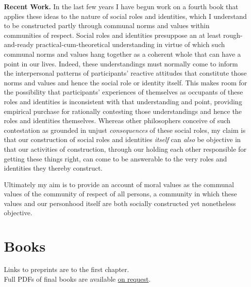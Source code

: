 \documentclass[%
  11pt,%
]{article}
\makeatletter
\newcommand{\onrequest}{\href{mailto:bhelm@fandm.edu}{on request}}
\makeatother
\begin{document}
\noindent\textbf{Recent Work.}
In the last few years I have begun work on a fourth book that applies these ideas to the nature of social roles and identities, which I understand to be constructed partly through communal norms and values within communities of respect. Social roles and identities presuppose an at least rough-and-ready practical-cum-theoretical understanding in virtue of which such communal norms and values hang together as a coherent whole that can have a point in our lives. Indeed, these understandings must normally come to inform the interpersonal patterns of participants' reactive attitudes that constitute those norms and values and hence the social role or identity itself. This makes room for the possibility that participants' experiences of themselves as occupants of these roles and identities is inconsistent with that understanding and point, providing empirical purchase for rationally contesting those understandings and hence the roles and identities themselves. Whereas other philosophers conceive of such contestation as grounded in unjust \emph{consequences} of these social roles, my claim is that our construction of social roles and identities \emph{itself} can \emph{also} be objective in that our activities of construction, through our holding each other responsible for getting these things right, can come to be answerable to the very roles and identities they thereby construct.

\bigskip{}

Ultimately my aim is to provide an account of moral values as the communal values of the community of respect of all persons, a community in which these values and our personhood itself are both socially constructed yet nonetheless objective.


\section{Books}

\newrefsection

\begin{center}
  Links to preprints are to the first chapter.\\
  Full PDFs of final books are available \onrequest{}.\\
  ~
\end{center}
\end{document}
